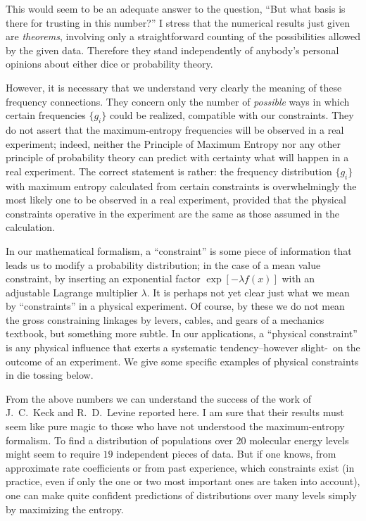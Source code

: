 This would seem to be an adequate answer to the question, ``But what basis is there for trusting in this number?''
I stress that the numerical results just given are \emph{theorems}, involving only a straightforward counting of the possibilities allowed by the given data.
Therefore they stand independently of anybody's personal opinions about either dice or probability theory.

However, it is necessary that we understand very clearly the meaning of these frequency connections.
They concern only the number of \emph{possible} ways in which certain frequencies $\{g_i\}$ could be realized, compatible with our constraints.
They do not assert that the maximum-entropy frequencies will be observed in a real experiment; indeed, neither the Principle of Maximum Entropy nor any other principle of probability theory can predict with certainty what will happen in a real experiment.
The correct statement is rather: the frequency distribution $\{g_i\}$ with maximum entropy calculated from certain constraints is overwhelmingly the most likely one to be observed in a real experiment, provided that the physical constraints operative in the experiment are the same as those assumed in the calculation.

In our mathematical formalism, a ``constraint'' is some piece of information that leads us to modify a probability distribution; in the case of a mean value constraint, by inserting an exponential factor $\exp[-\lambda f(x)]$ with an adjustable Lagrange multiplier $\lambda$.
It is perhaps not yet clear just what we mean by ``constraints'' in a physical experiment.
Of course, by these we do not mean the gross constraining linkages by levers, cables, and gears of a mechanics textbook, but something more subtle.
In our applications, a ``physical constraint'' is any physical influence that exerts a systematic tendency--however slight-~on the outcome of an experiment.
We give some specific examples of physical constraints in die tossing below.

From the above numbers we can understand the success of the work of J.~C.~Keck and R.~D.~Levine reported here.
I am sure that their results must seem like pure magic to those who have not understood the maximum-entropy formalism.
To find a distribution of populations over $20$ molecular energy levels might seem to require $19$ independent pieces of data.
But if one knows, from approximate rate coefficients or from past experience, which constraints exist (in practice, even if only the one or two most important ones are taken into account), one can make quite confident predictions of distributions over many levels simply by maximizing the entropy.

